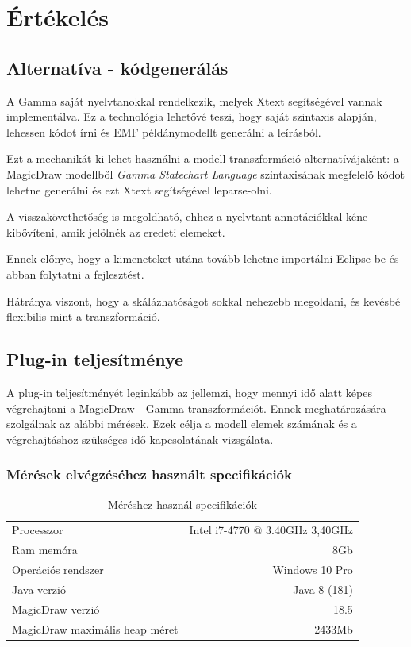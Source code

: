 \chapter{Értékelés}
\label{chap:ertekeles}
\section{Alternatíva - kódgenerálás}
A Gamma saját nyelvtanokkal rendelkezik, melyek Xtext segítségével vannak implementálva. Ez a technológia lehetővé teszi, hogy saját szintaxis alapján, lehessen kódot írni és EMF példánymodellt generálni a leírásból.

Ezt a mechanikát ki lehet használni a modell transzformáció alternatívájaként: a MagicDraw modellből \emph{Gamma Statechart Language} szintaxisának megfelelő kódot lehetne generálni és ezt Xtext segítségével leparse-olni.

A visszakövethetőség is megoldható, ehhez a nyelvtant annotációkkal kéne kibővíteni, amik jelölnék az eredeti elemeket.

Ennek előnye, hogy a kimeneteket utána tovább lehetne importálni Eclipse-be és abban folytatni a fejlesztést.

Hátránya viszont, hogy a skálázhatóságot sokkal nehezebb megoldani, és kevésbé flexibilis mint a transzformáció.

\section{Plug-in teljesítménye}

A plug-in teljesítményét leginkább az jellemzi, hogy mennyi idő alatt képes végrehajtani a MagicDraw - Gamma transzformációt. Ennek meghatározására szolgálnak az alábbi mérések. Ezek célja a modell elemek számának és a végrehajtáshoz szükséges idő kapcsolatának vizsgálata.

\subsection{Mérések elvégzéséhez használt specifikációk}

\begin{table}[!h]
	\footnotesize
	\centering
	\begin{tabular}{ l r }
		Processzor & Intel i7-4770 @ 3.40GHz 3,40GHz \\
		Ram memóra & 8Gb\\
		Operációs rendszer & Windows 10 Pro \\
		Java verzió & Java 8 (181) \\
		MagicDraw verzió & 18.5 \\
		MagicDraw maximális heap méret & 2433Mb
	\end{tabular}
	\caption{Méréshez használ specifikációk}
	\label{table:gepspec}
\end{table}

